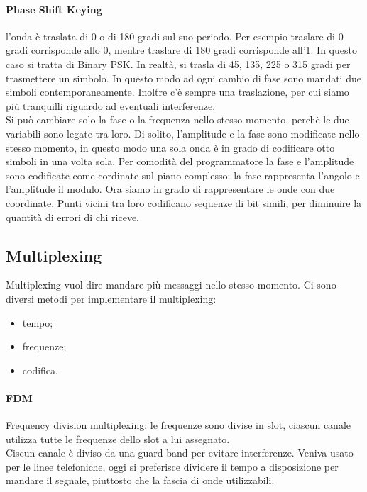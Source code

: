 \documentclass{article}
\begin{document}
\paragraph{Phase Shift Keying} l'onda è traslata di 0 o di 180 gradi sul suo
periodo. Per esempio traslare di 0 gradi corrisponde allo 0, mentre traslare di
180 gradi corrisponde all'1. In questo caso si tratta di Binary PSK. In realtà,
si trasla di 45, 135, 225 o 315 gradi per trasmettere un simbolo. In questo modo
ad ogni cambio di fase sono mandati due simboli contemporaneamente. Inoltre c'è
sempre una traslazione, per cui siamo più tranquilli riguardo ad eventuali
interferenze.\\

Si può cambiare solo la fase o la frequenza nello stesso momento, perchè le due
variabili sono legate tra loro. Di solito, l'amplitude e la fase sono modificate
nello stesso momento, in questo modo una sola onda è in grado di codificare otto
simboli in una volta sola. Per comodità del programmatore la fase e
l'amplitude sono codificate come cordinate sul piano complesso: la fase
rappresenta l'angolo e l'amplitude il modulo. Ora siamo in grado di
rappresentare le onde con due coordinate. Punti vicini tra loro codificano
sequenze di bit simili, per diminuire la quantità di errori di chi riceve.

\subsection{Multiplexing}
Multiplexing vuol dire mandare più messaggi nello stesso momento.
Ci sono diversi metodi per implementare il multiplexing:
\begin{itemize}
	\item tempo;
	\item frequenze;
	\item codifica.
\end{itemize}

\paragraph{FDM} Frequency division multiplexing: le frequenze sono divise in
slot, ciascun canale utilizza tutte le frequenze dello slot a lui assegnato.\\
Ciscun canale è diviso da una guard band per evitare interferenze. Veniva usato
per le linee telefoniche, oggi si preferisce dividere il tempo a disposizione
per mandare il segnale, piuttosto che la fascia di onde utilizzabili.
\end{document}
